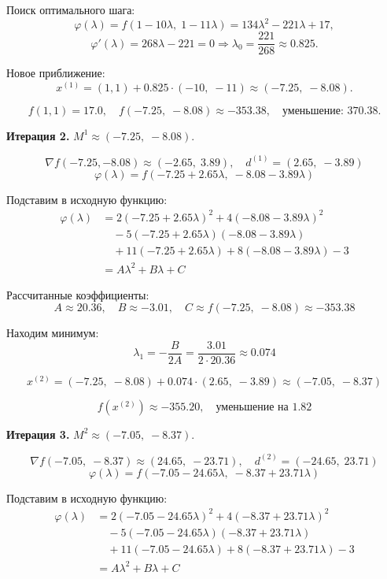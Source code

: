 \documentclass{article}
\begin{document}
Поиск оптимального шага:
\[
\varphi(\lambda) = f(1 - 10\lambda,\; 1 - 11\lambda) = 134\lambda^2 - 221\lambda + 17,
\]
\[
\varphi'(\lambda) = 268\lambda - 221 = 0 \Rightarrow \lambda_0 = \frac{221}{268} \approx 0.825.
\]

Новое приближение:
\[
x^{(1)} = (1,1) + 0.825 \cdot (-10,\;-11) \approx (-7.25,\;-8.08).
\]

\[
f(1,1) = 17.0,\quad f(-7.25,\;-8.08) \approx -353.38,\quad \text{уменьшение: } 370.38.
\]

\textbf{Итерация 2.} $M^1 \approx (-7.25,\;-8.08)$.

\[
\nabla f(-7.25,-8.08) \approx (-2.65,\; 3.89), \quad d^{(1)} = (2.65,\; -3.89)
\]
\[
\varphi(\lambda) = f(-7.25 + 2.65\lambda,\; -8.08 - 3.89\lambda)
\]

Подставим в исходную функцию:
\begin{align*}
\varphi(\lambda) &= 2(-7.25 + 2.65\lambda)^2 + 4(-8.08 - 3.89\lambda)^2 \\
&\quad -5(-7.25 + 2.65\lambda)(-8.08 - 3.89\lambda) \\
&\quad + 11(-7.25 + 2.65\lambda) + 8(-8.08 - 3.89\lambda) - 3 \\
&= A\lambda^2 + B\lambda + C
\end{align*}

Рассчитанные коэффициенты:
\[
A \approx 20.36,\quad B \approx -3.01,\quad C \approx f(-7.25,\;-8.08) \approx -353.38
\]

Находим минимум:
\[
\lambda_1 = -\frac{B}{2A} = \frac{3.01}{2 \cdot 20.36} \approx 0.074
\]

\[
x^{(2)} = (-7.25,\;-8.08) + 0.074 \cdot (2.65,\; -3.89) \approx (-7.05,\; -8.37)
\]

\[
f(x^{(2)}) \approx -355.20,\quad \text{уменьшение на } 1.82
\]

\bigskip
\textbf{Итерация 3.} $M^2 \approx (-7.05,\;-8.37)$.

\[
\nabla f(-7.05,\;-8.37) \approx (24.65,\; -23.71), \quad d^{(2)} = (-24.65,\; 23.71)
\]
\[
\varphi(\lambda) = f(-7.05 - 24.65\lambda,\; -8.37 + 23.71\lambda)
\]

Подставим в исходную функцию:
\begin{align*}
\varphi(\lambda) &= 2(-7.05 - 24.65\lambda)^2 + 4(-8.37 + 23.71\lambda)^2 \\
&\quad -5(-7.05 - 24.65\lambda)(-8.37 + 23.71\lambda) \\
&\quad + 11(-7.05 - 24.65\lambda) + 8(-8.37 + 23.71\lambda) - 3 \\
&= A\lambda^2 + B\lambda + C
\end{align*}
\end{document}
